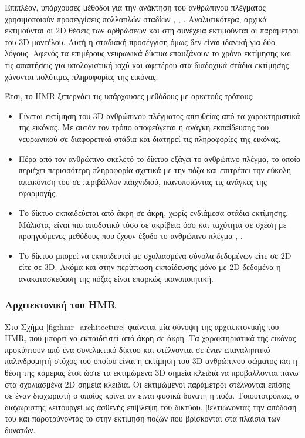 Επιπλέον, υπάρχουσες μέθοδοι για την ανάκτηση του ανθρώπινου πλέγματος χρησιμοποιούν προσεγγίσεις πολλαπλών σταδίων \cite{keep_it_smpl_paper}, \cite{unite_the_people}, \cite{estimate_from_single_color_paper}. Αναλυτικότερα, αρχικά εκτιμούνται οι 2D θέσεις των αρθρώσεων και στη συνέχεια εκτιμούνται οι παράμετροι του 3D μοντέλου. Αυτή η σταδιακή προσέγγιση όμως δεν είναι ιδανική για δύο λόγους. Αφενός τα επιμέρους νευρωνικά δίκτυα επαυξάνουν το χρόνο εκτίμησης και τις απαιτήσεις για υπολογιστική ισχύ και αφετέρου στα διαδοχικά στάδια εκτίμησης χάνονται πολύτιμες πληροφορίες της εικόνας.

Έτσι, το HMR ξεπερνάει τις υπάρχουσες μεθόδους με αρκετούς τρόπους:

\begin{itemize}
	\item Γίνεται εκτίμηση του 3D ανθρώπινου πλέγματος απευθείας από τα χαρακτηριστικά της εικόνας. Με αυτόν τον τρόπο αποφεύγεται η ανάγκη εκπαίδευσης του νευρωνικού σε διαφορετικά στάδια και διατηρεί τις πληροφορίες της εικόνας.
	\item Πέρα από τον ανθρώπινο σκελετό το δίκτυο εξάγει το ανθρώπινο πλέγμα, το οποίο περιέχει περισσότερη πληροφορία σχετικά με την πόζα και επιτρέπει την εύκολη απεικόνιση του σε περιβάλλον παιχνιδιού, ικανοποιώντας τις ανάγκες της εφαρμογής.
	\item Το δίκτυο εκπαιδεύεται από άκρη σε άκρη, χωρίς ενδιάμεσα στάδια εκτίμησης. Μάλιστα, είναι πιο αποδοτικό τόσο σε ακρίβεια όσο και ταχύτητα σε σχέση με προηγούμενες μεθόδους που έχουν έξοδο το ανθρώπινο πλέγμα \cite{unite_the_people}, \cite{keep_it_smpl_paper}.
	\item Το δίκτυο μπορεί να εκπαιδευτεί με σχολιασμένα σύνολα δεδομένων είτε σε 2D είτε σε 3D. Ακόμα και στην περίπτωση εκπαίδευσης μόνο με 2D δεδομένα η ανακατασκεύαση της πόζας είναι επαρκώς ικανοποιητική.
\end{itemize}

\subsubsection{Αρχιτεκτονική του HMR}
Στο Σχήμα \ref{fig:hmr_architecture} φαίνεται μία σύνοψη της αρχιτεκτονικής του HMR, που μπορεί να εκπαιδευτεί από άκρη σε άκρη. Τα χαρακτηριστικά της εικόνας προκύπτουν από ένα συνελικτικό δίκτυο και στέλνονται σε έναν επαναληπτικό παλινδρομητή στόχος του οποίου είναι η εκτίμηση του 3D ανθρώπινου σώματος και η θέση της κάμερας έτσι ώστε τα εκτιμώμενα 3D σημεία κλειδιά να προβάλλονται πάνω στα σχολιασμένα 2D σημεία κλειδιά. Οι εκτιμώμενοι παράμετροι στέλνονται επίσης σε έναν διαχωριστή ο οποίος κρίνει αν είναι φυσικά δυνατή η πόζα. Τοιουτοτρόπως, ο διαχωριστής λειτουργεί ως ασθενής επίβλεψη του δικτύου, βελτιώνοντας την απόδοση του και παροτρύνοντάς το στην εκτίμηση ποζών που βρίσκονται στα πλαίσια των δυνατών.

